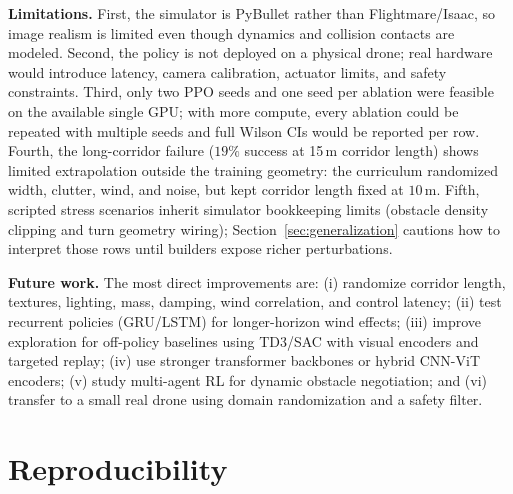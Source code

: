 \documentclass[twocolumn,a4paper,10pt]{article}
\begin{document}
\textbf{Limitations.}
First, the simulator is PyBullet rather than Flightmare/Isaac, so image
realism is limited even though dynamics and collision contacts are modeled.
Second, the policy is not deployed on a physical drone; real hardware would
introduce latency, camera calibration, actuator limits, and safety constraints.
Third, only two PPO seeds and one seed per ablation were feasible on the
available single GPU; with more compute, every ablation could be repeated
with multiple seeds and full Wilson CIs would be reported per row.  Fourth,
the long-corridor failure ($19\%$ success at 15\,m corridor length) shows
limited extrapolation outside the training geometry: the curriculum
randomized width, clutter, wind, and noise, but kept corridor length fixed
at $10$\,m.
Fifth, scripted stress scenarios inherit simulator bookkeeping limits (obstacle density clipping and turn geometry wiring); Section~\ref{sec:generalization} cautions how to interpret those rows until builders expose richer perturbations.

\textbf{Future work.}
The most direct improvements are: (i) randomize corridor length, textures,
lighting, mass, damping, wind correlation, and control latency; (ii) test
recurrent policies (GRU/LSTM) for longer-horizon wind effects; (iii) improve
exploration for off-policy baselines using TD3/SAC with visual encoders and
targeted replay; (iv) use stronger transformer backbones or hybrid CNN-ViT
encoders; (v) study multi-agent RL for dynamic obstacle negotiation; and
(vi) transfer to a small real drone using domain randomization and a safety
filter.

\section*{Reproducibility}
\end{document}
